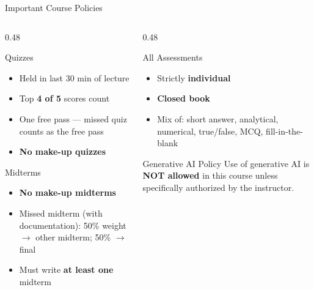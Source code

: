 \documentclass[aspectratio=169]{beamer}
\begin{document}
\begin{frame}{Important Course Policies}
\transfade
\begin{columns}
  \begin{column}{0.48\textwidth}
    \begin{block}{Quizzes}
      \begin{itemize}
        \item Held in last 30 min of lecture
        \item Top \textbf{4 of 5} scores count
        \item One free pass --- missed quiz counts as the free pass
        \item \textbf{No make-up quizzes}
      \end{itemize}
    \end{block}
    \vspace{0.3em}
    \begin{block}{Midterms}
      \begin{itemize}
        \item \textbf{No make-up midterms}
        \item Missed midterm (with documentation): 50\% weight $\to$ other midterm; 50\% $\to$ final
        \item Must write \textbf{at least one} midterm
      \end{itemize}
    \end{block}
  \end{column}
  \begin{column}{0.48\textwidth}
    \begin{block}{All Assessments}
      \begin{itemize}
        \item Strictly \textbf{individual}
        \item \textbf{Closed book}
        \item Mix of: short answer, analytical, numerical, true/false, MCQ, fill-in-the-blank
      \end{itemize}
    \end{block}
    \vspace{0.3em}
    \begin{alertblock}{Generative AI Policy}
      Use of generative AI is \textbf{NOT allowed} in this course unless specifically authorized by the instructor.
    \end{alertblock}
  \end{column}
\end{columns}
\end{frame}
\end{document}
